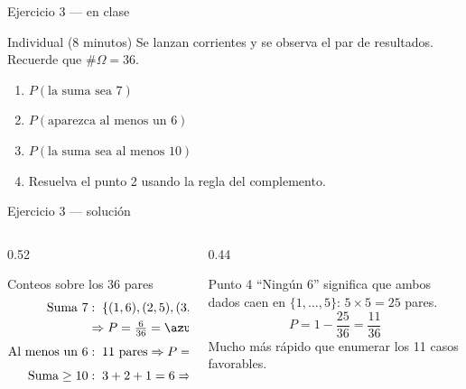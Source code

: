 \documentclass[aspectratio=169,10pt]{beamer}
\begin{document}
\begin{frame}{Ejercicio 3 — en clase}
  \begin{alertblock}{Individual (8 minutos)}
    Se lanzan  corrientes y se observa el par de
    resultados. Recuerde que $\#\Omega=36$.

    \vspace{0.3cm}
    \begin{enumerate}
      \item $P(\text{la suma sea }7)$
      \item $P(\text{aparezca al menos un }6)$
      \item $P(\text{la suma sea al menos }10)$
      \item Resuelva el punto 2 usando la regla del complemento.
    \end{enumerate}
  \end{alertblock}
\end{frame}

\begin{frame}{Ejercicio 3 — solución}
  \begin{columns}[T,onlytextwidth]
    \begin{column}{0.52\textwidth}
      \begin{block}{Conteos sobre los 36 pares}
        \footnotesize
        \begin{align*}
          \text{Suma }7&:\;\{(1,6),(2,5),(3,4),(4,3),(5,2),(6,1)\}\\
          &\Rightarrow P=\tfrac{6}{36}=\azul{0{,}1667}\\[0.3em]
          \text{Al menos un }6&:\; 11 \text{ pares}
            \Rightarrow P=\tfrac{11}{36}=\azul{0{,}3056}\\[0.3em]
          \text{Suma}\ge 10&:\; 3+2+1=6
            \Rightarrow P=\tfrac{6}{36}=\azul{0{,}1667}
        \end{align*}
      \end{block}
    \end{column}
    \begin{column}{0.44\textwidth}
      \begin{exampleblock}{Punto 4}
        \footnotesize
        ``Ningún 6'' significa que ambos dados caen en $\{1,\dots,5\}$:
        $5\times 5=25$ pares.
        \[ P=1-\frac{25}{36}=\frac{11}{36} \]
        Mucho más rápido que enumerar los 11 casos favorables.
      \end{exampleblock}
    \end{column}
  \end{columns}
\end{frame}
\end{document}
